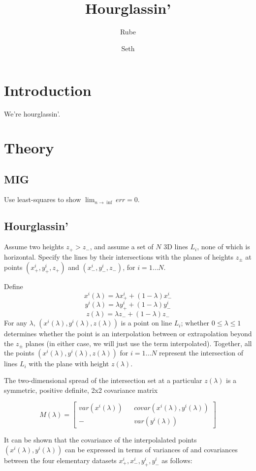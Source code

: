 \documentclass{article}
\begin{document}
\title{Hourglassin'}
\author{Rube}
\author{Seth}

\section{Introduction}
We're hourglassin'.

\section{Theory}
\subsection{MIG}
Use least-squares to show
$\lim_{n\rightarrow\inf}err=0$.

\subsection{Hourglassin'}
Assume two heights $z_{+} > z_{-}$, and assume a set of $N$ 3D lines
$L_i$, none of which is horizontal. Specify the lines by their
intersections with the planes of heights $z_\pm$ at points
$(x_{+}^{i},y_{+}^{i}, z_+)$ and $(x_{-}^{i},y_{-}^{i}, z_-)$, for
$i=1\ldots N$.

Define
$$x^i(\lambda) = \lambda x^i_+ + (1-\lambda) x^i_-$$
$$y^i(\lambda) = \lambda y^i_+ + (1-\lambda) y^i_-$$
$$z(\lambda) = \lambda z_- + (1-\lambda) z_-$$ For any $\lambda$,
$(x^i(\lambda), y^i(\lambda), z(\lambda))$ is a point on line $L_i$;
whether $0\le\lambda\le 1$ determines whether the point is an
interpolation between or extrapolation beyond the $z_\pm$ planes (in
either case, we will just use the term interpolated). Together, all
the points $(x^i(\lambda), y^i(\lambda), z(\lambda))$ for $i=1\ldots
N$ represent the intersection of lines $L_i$ with the plane with
height $z(\lambda)$.

The two-dimensional spread of the intersection set at a particular
$z(\lambda)$ is a symmetric, positive definite, 2x2
covariance matrix

\[M(\lambda) =
\begin{bmatrix}
 var(x^i(\lambda)) && covar(x^i(\lambda),y^i(\lambda)) \\
  -                && var(y^i(\lambda))
\end{bmatrix}
\]

It can be shown that the covariance of the interpolalated points
$(x^i(\lambda),y^i(\lambda))$ can be expressed in terms of variances of and covariances between the four elementary datasets $x^i_+, x^i_-, y^i_+, y^i_-$ as follows:
\end{document}
